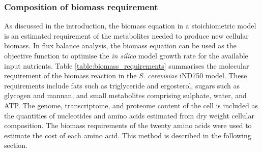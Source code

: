 \subsubsection{Composition of biomass requirement}%

As discussed in the introduction, the biomass equation in a stoichiometric model is an estimated requirement of the metabolites needed to produce new cellular biomass. In flux balance analysis, the biomass equation can be used as the objective function to optimise the \emph{in silico} model growth rate for the available input nutrients. Table \vref{table:biomass_requirements} summarises the molecular requirement of the biomass reaction in the \emph{S. cerevisiae} iND750 model. These requirements include fats such as triglyceride and ergosterol, sugars such as glycogen and mannan, and small metabolites comprising sulphate, water, and ATP. The genome, transcriptome, and proteome content of the cell is included as the quantities of nucleotides and amino acids estimated from dry weight cellular composition. The biomass requirements of the twenty amino acids were used to estimate the cost of each amino acid. This method is described in the following section.

